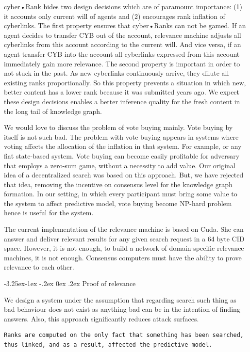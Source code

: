 \documentclass[8pt,oneside]{amsart}
\makeatletter
\newcommand{\linkgreen}[2]{\href{#1}{\color{green}{#2}}}
\renewcommand\subsection{\@startsection{subsection}{2}{\z@}%
                                     {-3.25ex\@plus -1ex \@minus -.2ex}%
                                     {0ex \@plus .2ex}%
                                     {\play\Large}}%
\newcommand{\titleSection}[1]{\subsection{#1}}
\makeatother
\begin{document}
cyber•Rank hides two design decisions which are of paramount importance: (1) it accounts only current will of agents and (2) encourages rank inflation of cyberlinks. The first property ensures that cyber•Ranks can not be gamed. If an agent decides to transfer CYB out of the account, relevance machine adjusts all cyberlinks from this account according to the current will. And vice versa, if an agent transfer CYB into the account all cyberlinks expressed from this account immediately gain more relevance. The second property is important in order to not stuck in the past. As new cyberlinks continuously arrive, they dilute all existing ranks proportionally. So this property prevents a situation in which new, better content has a lower rank because it was submitted years ago. We expect these design decisions enables a better inference quality for the fresh content in the long tail of knowledge graph.

We would love to discuss the problem of vote buying mainly. Vote buying by itself is not such bad. The problem with vote buying appears in systems where voting affects the allocation of the inflation in that system. For example, \linkgreen{http://ipfs.io/ipfs/QmepU77tqMAHHuiSASUvUnu8f8ENuPF2Kfs97WjLn8vAS3}{Steem}
or any fiat state-based system. Vote buying can become easily profitable for adversary that employs a zero-sum game, without a necessity to add value. Our original idea of a decentralized search was based on this approach. But, we have rejected that idea, removing the incentive on consensus level for the knowledge graph formation. In our setting, in which every participant must bring some value to the system to affect predictive model, vote buying become NP-hard problem hence is useful for the system.

The current implementation of the relevance machine is based on Cuda. She can answer and deliver relevant results for any given search request in a 64 byte CID space. However, it is not enough, to build a network of domain-specific relevance machines, it is not enough. Consensus computers must have the ability to prove relevance to each other.

\titleSection{Proof of relevance}\label{Proof of relevance}

We design a system under the assumption that regarding search such thing as bad behaviour does not exist as anything bad can be in the intention of finding answers. Also, this approach significantly reduces attack surfaces.

\begin{lstlisting}
Ranks are computed on the only fact that something has been searched,
thus linked, and as a result, affected the predictive model.
\end{lstlisting}
\end{document}
